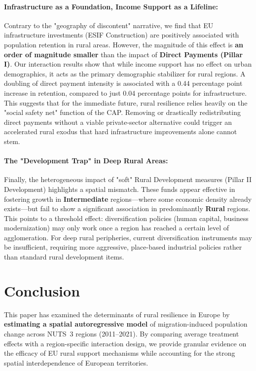 \documentclass[
	a4paper, %
	10pt, %
]{LTJournalArticle}
\begin{document}
\paragraph{Infrastructure as a Foundation, Income Support as a Lifeline:}
Contrary to the "geography of discontent" narrative, we find that EU infrastructure investments (ESIF Construction) are positively associated with population retention in rural areas. However, the magnitude of this effect is \textbf{an order of magnitude smaller} than the impact of \textbf{Direct Payments (Pillar I)}. Our interaction results show that while income support has no effect on urban demographics, it acts as the primary demographic stabilizer for rural regions. A doubling of direct payment intensity is associated with a 0.44 percentage point increase in retention, compared to just 0.04 percentage points for infrastructure. This suggests that for the immediate future, rural resilience relies heavily on the "social safety net" function of the CAP. Removing or drastically redistributing direct payments without a viable private-sector alternative could trigger an accelerated rural exodus that hard infrastructure improvements alone cannot stem.

\paragraph{The "Development Trap" in Deep Rural Areas:}
Finally, the heterogeneous impact of "soft" Rural Development measures (Pillar II Development) highlights a spatial mismatch. These funds appear effective in fostering growth in \textbf{Intermediate} regions—where some economic density already exists—but fail to show a significant association in predominantly \textbf{Rural} regions. This points to a threshold effect: diversification policies (human capital, business modernization) may only work once a region has reached a certain level of agglomeration. For deep rural peripheries, current diversification instruments may be insufficient, requiring more aggressive, place-based industrial policies rather than standard rural development items.

\section{Conclusion}

This paper has examined the determinants of rural resilience in Europe by \textbf{estimating a spatial autoregressive model} of migration-induced population change across NUTS~3 regions (2011--2021). By comparing average treatment effects with a region-specific interaction design, we provide granular evidence on the efficacy of EU rural support mechanisms while accounting for the strong spatial interdependence of European territories.
\end{document}
